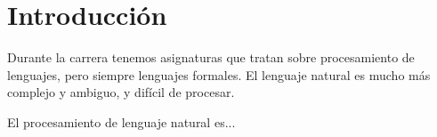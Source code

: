 
\chapter{Introducción}

Durante la carrera tenemos asignaturas que tratan sobre procesamiento de lenguajes, pero siempre lenguajes formales. El lenguaje natural es mucho más complejo y ambiguo, y difícil de procesar.


\begin{definition}[NLP]
El procesamiento de lenguaje natural es...
\end{definition}
